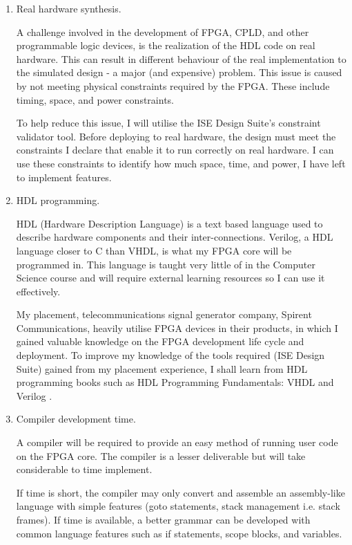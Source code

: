 \begin{enumerate}
\item{
Real hardware synthesis. 

A challenge involved in the development of FPGA, CPLD, and other programmable logic devices, is the realization of the HDL code on real hardware. This can result in different behaviour of the real implementation to the simulated design - a major (and expensive) problem. This issue is caused by not meeting physical constraints required by the FPGA. These include timing, space, and power constraints.

To help reduce this issue, I will utilise the ISE Design Suite's constraint validator tool. Before deploying to real hardware, the design must meet the constraints I declare that enable it to run correctly on real hardware. I can use these constraints to identify how much space, time, and power, I have left to implement features.
}\label{risk:hw}
\item{
HDL programming. 

HDL (Hardware Description Language) is a text based language used to describe hardware components and their inter-connections. Verilog, a HDL language closer to C than VHDL, is what my FPGA core will be programmed in. This language is taught very little of in the Computer Science course and will require external learning resources so I can use it effectively. 

My placement,  telecommunications signal generator company, Spirent Communications, heavily utilise FPGA devices in their products, in which I gained valuable knowledge on the FPGA development life cycle and deployment. To improve my knowledge of the tools required (ISE Design Suite) gained from my placement experience, I shall learn from HDL programming books such as HDL Programming Fundamentals: VHDL and Verilog \citep{hdl}.
}

\item{Compiler development time. 

A compiler will be required to provide an easy method of running user code on the FPGA core. The compiler is a lesser deliverable but will take considerable to time implement.

If time is short, the compiler may only convert and assemble an assembly-like language with simple features (goto statements, stack management i.e. stack frames). If time is available, a better grammar can be developed with common language features such as if statements, scope blocks, and variables.

}
\end{enumerate}

